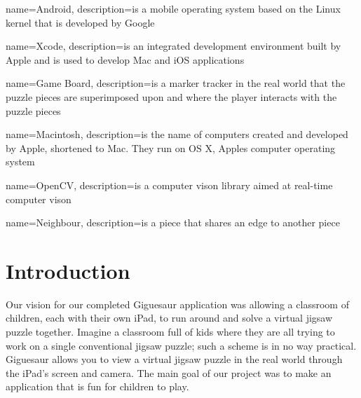 \documentclass{article}
\begin{document}
 { name={Android}, description={is a mobile operating
    system based on the Linux kernel that is developed by Google} }

 { name={Xcode}, description={is an integrated
    development environment built by Apple and is used to develop Mac and iOS
    applications} }

 { name={Game Board}, description={is a marker
    tracker in the real world that the puzzle pieces are superimposed upon and
    where the player interacts with the puzzle pieces} }

 { name={Macintosh}, description={is the name of computers
    created and developed by Apple, shortened to Mac. They run on OS X, Apples
    computer operating system} }

 { name={OpenCV}, description={is a computer vison
    library aimed at real-time computer vison} }

 { name={Neighbour}, description={is a piece that
    shares an edge to another piece} }

\makeglossaries


\clearpage
\tableofcontents
\clearpage

\setcounter{page}{1}


\section{Introduction}

Our vision for our completed Giguesaur application was allowing a classroom of
children, each with their own iPad, to run around and solve a virtual jigsaw
puzzle together. Imagine a classroom full of kids where they are all trying to
work on a single conventional jigsaw puzzle; such a scheme is in no way
practical. Giguesaur allows you to view a virtual jigsaw puzzle in the real
world through the iPad's screen and camera. The main goal of our project was to
make an application that is fun for children to play.
\end{document}
